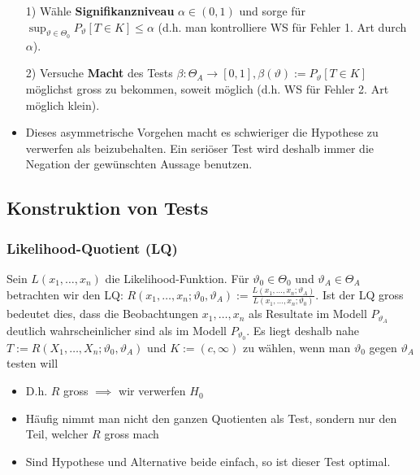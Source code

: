 \begin{itemize}
        \begin{itemize}
            \item[1)] Wähle \textbf{Signifikanzniveau} $\alpha \in (0, 1)$ und sorge für $\sup_{\vartheta \in \Theta_0} P_\vartheta[T \in K] \le \alpha$ (d.h. man kontrolliere WS für Fehler 1. Art durch $\alpha$).
            \item[2)] Versuche \textbf{Macht} des Tests $\beta: \Theta_A \to [0, 1], \beta(\vartheta) := P_\vartheta[T \in K]$ möglichst gross zu bekommen, soweit möglich (d.h. WS für Fehler 2. Art möglich klein).
            \item Dieses asymmetrische Vorgehen macht es schwieriger die Hypothese zu verwerfen als beizubehalten. Ein seriöser Test wird deshalb immer die Negation der gewünschten Aussage benutzen.
        \end{itemize}
\end{itemize}

\subsection{Konstruktion von Tests}
\subsubsection{Likelihood-Quotient (LQ)}
Sein $L(x_1, \dots, x_n)$ die Likelihood-Funktion. Für $\vartheta_0 \in \Theta_0$ und $\vartheta_A \in \Theta_A$ betrachten wir den LQ: $R(x_1, \dots, x_n; \vartheta_0, \vartheta_A) := \frac{L(x_1, \dots, x_n; \vartheta_A)}{L(x_1, \dots, x_n; \vartheta_0)}$. Ist der LQ gross bedeutet dies, dass die Beobachtungen $x_1, \dots, x_n$ als Resultate im Modell $P_{\vartheta_A}$ deutlich wahrscheinlicher sind als im Modell $P_{\vartheta_0}$. Es liegt deshalb nahe $T:= R(X_1, \dots, X_n; \vartheta_0, \vartheta_A)$ und $K := (c, \infty)$ zu wählen, wenn man $\vartheta_0$ gegen $\vartheta_A$ testen will
\begin{itemize}
    \item D.h. $R$ gross $\implies$ wir verwerfen $H_0$
    \item Häufig nimmt man nicht den ganzen Quotienten als Test, sondern nur den Teil, welcher $R$ gross mach
    \item Sind Hypothese und Alternative beide einfach, so ist dieser Test optimal.
\end{itemize}

